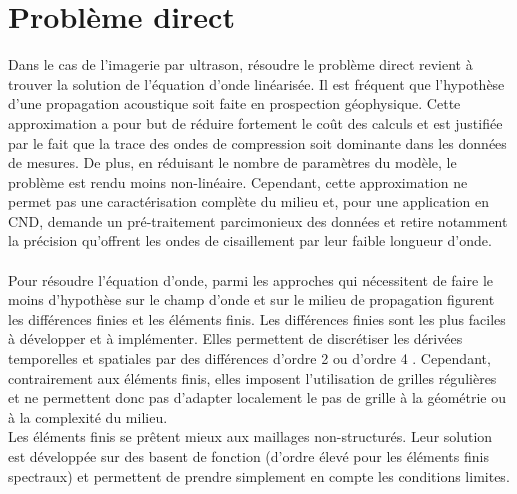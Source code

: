

\section{Problème direct \label{pd_dir}}

Dans le cas de l'imagerie par ultrason, résoudre le problème direct revient à trouver la solution de l'équation d'onde linéarisée. Il est fréquent que l'hypothèse d'une propagation acoustique soit faite en prospection géophysique. Cette approximation a pour but de réduire fortement le coût des calculs et est justifiée par le fait que la trace des ondes de compression soit dominante dans les données de mesures. De plus, en réduisant le nombre de paramètres du modèle, le problème est rendu moins non-linéaire. Cependant, cette approximation ne permet pas une caractérisation complète du milieu et, pour une application en CND, demande un pré-traitement parcimonieux des données et retire notamment la précision qu'offrent les ondes de cisaillement par leur faible longueur d'onde.\\~\\




 Pour résoudre l'équation d'onde, parmi les approches qui nécessitent de faire le moins d'hypothèse sur le champ d'onde et sur le milieu de propagation figurent les différences finies et les éléments finis. Les différences finies sont les plus faciles à développer et à implémenter. Elles permettent de discrétiser les dérivées temporelles et spatiales par des différences d'ordre 2 \citep{virieux_86} ou d'ordre 4 \citep{levander}. Cependant, contrairement aux éléments finis, elles imposent l'utilisation de grilles régulières et ne permettent donc pas d'adapter localement le pas de grille à la géométrie ou à la complexité du milieu. \\ Les éléments finis se prêtent mieux aux maillages non-structurés. Leur solution est développée sur des basent de fonction (d'ordre élevé pour les éléments finis spectraux) et permettent de prendre simplement en compte les conditions limites.\\
 
